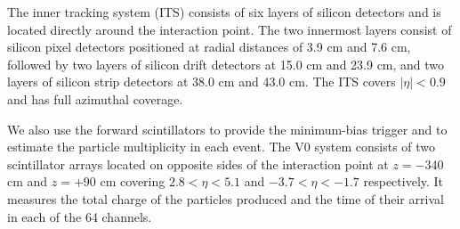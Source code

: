 The inner tracking system (ITS) consists of six layers of silicon detectors and is located directly around the interaction point. The two innermost layers consist of silicon pixel detectors positioned at radial distances of 3.9 cm and 7.6 cm, followed by two layers of silicon drift detectors at 15.0 cm and 23.9 cm, and two layers of silicon strip detectors at 38.0 cm and 43.0 cm. The ITS covers $|\eta|<0.9$ and has full azimuthal coverage. 

We also use the forward scintillators to provide the minimum-bias trigger and to estimate the particle multiplicity in each event. The V0 system consists of two scintillator arrays located on opposite sides of the interaction point at $z=-340$ cm and $z=+90$ cm covering $2.8 <\eta < 5.1$ and $-3.7 <\eta < -1.7$ respectively. It measures the total charge of the particles produced and the time of their arrival in each of the 64 channels.  